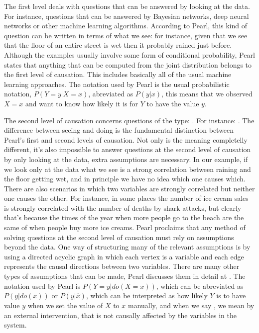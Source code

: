 The first level deals with questions that can be answered by looking at the data. For instance, questions that can be answered by Bayesian networks, deep neural networks or other machine learning algorithms. According to Pearl, this kind of question can be written in terms of what we see: for instance, given that we see that the floor of an entire street is wet then it probably rained just before. Although the examples usually involve some form of conditional probability, Pearl states that anything that can be computed from the joint distribution belongs to the first level of causation. This includes basically all of the usual machine learning approaches. The notation used by Pearl is the usual probabilistic notation, $P(Y=y|X=x)$, abreviated as $P(y|x)$, this means that we observed $X=x$ and want to know how likely it is for $Y$ to have the value $y$.

The second level of causation concerns questions of the type: . For instance: . The difference between seeing and doing is the fundamental distinction between Pearl's first and second levels of causation. Not only is the meaning completelly different, it's also impossible to answer questions at the second level of causation by only looking at the data, extra assumptions are necessary. In our example, if we look only at the data what we see is a strong correlation between raining and the floor getting wet, and in principle we have no idea which one causes which. There are also scenarios in which two variables are strongly correlated but neither one causes the other. For instance, in some places the number of ice cream sales is strongly correlated with the number of deaths by  shark attacks, but clearly that's because the times of the year when more people go to the beach are the same of when people buy more ice creams. Pearl proclaims that any method of solving questions at the second level of causation must rely on assumptions beyond the data. One way of structuring many of the relevant assumptions is by using a directed acyclic graph in which each vertex is a variable and each edge represents the causal directions between two variables. There are many other types of assumptions that can be made, Pearl discusses them in detail at \cite{Causality}. The notation used by Pearl is $P(Y=y|do(X=x))$, which can be abreviated as $P(y|do(x))$ or $P(y|\hat{x})$, which can be interpreted as how likely $Y$ is to have value $y$ when we set the value of $X$ to $x$ manually, and when we say , we mean by an external intervention, that is not causally affected by the variables in the system. 

